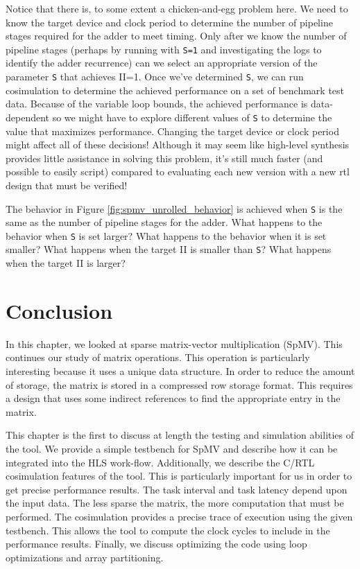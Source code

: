 Notice that there is, to some extent a chicken-and-egg problem here.   We need to know the target device and clock period to determine the number of pipeline stages required for the adder to meet timing.  Only after we know the number of pipeline stages (perhaps by running with \lstinline|S=1| and investigating the \VHLS logs to identify the adder recurrence) can we select an appropriate version of the parameter \lstinline|S| that achieves II=1.  Once we've determined \lstinline|S|, we can run \gls{cosimulation} to determine the achieved performance on a set of benchmark test data.  Because of the variable loop bounds, the achieved performance is data-dependent so we might have to explore different values of \lstinline|S| to determine the value that maximizes performance.  Changing the target device or clock period might affect all of these decisions!  Although it may seem like high-level synthesis provides little assistance in solving this problem, it's still much faster (and possible to easily script) compared to evaluating each new version with a new \gls{rtl} design that must be verified!  

\begin{exercise}
The behavior in Figure \ref{fig:spmv_unrolled_behavior} is achieved when \lstinline|S| is the same as the number of pipeline stages for the adder.   What happens to the behavior when \lstinline|S| is set larger?  What happens to the behavior when it is set smaller?  What happens when the target II is smaller than \lstinline|S|?  What happens when the target II is larger?
\end{exercise}


\section{Conclusion}
In this chapter, we looked at sparse matrix-vector multiplication (SpMV). This continues our study of matrix operations. This operation is particularly interesting because it uses a unique data structure. In order to reduce the amount of storage, the matrix is stored in a compressed row storage format. This requires a design that uses some indirect references to find the appropriate entry in the matrix. 

This chapter is the first to discuss at length the testing and simulation abilities of the \VHLS tool. We provide a simple testbench for SpMV and describe how it can be integrated into the HLS work-flow. Additionally, we describe the C/RTL cosimulation features of the \VHLS tool. This is particularly important for us in order to get precise performance results. The task interval and task latency depend upon the input data. The less sparse the matrix, the more computation that must be performed. The cosimulation provides a precise trace of execution using the given testbench. This allows the tool to compute the clock cycles to include in the performance results.  Finally, we discuss optimizing the code using loop optimizations and array partitioning. 